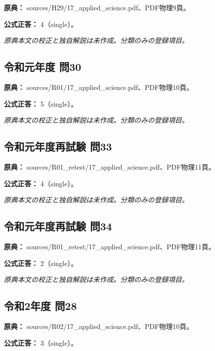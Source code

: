 \noindent\textbf{原典：} sources/H29/17\_applied\_science.pdf、PDF物理9頁。

\textbf{公式正答：} 4（single）。

\par\textit{原典本文の校正と独自解説は未作成。分類のみの登録項目。}

\subsection{令和元年度 問30}
\label{q:r01-reg-applied-30}

\noindent\textbf{原典：} sources/R01/17\_applied\_science.pdf、PDF物理10頁。

\textbf{公式正答：} 5（single）。

\par\textit{原典本文の校正と独自解説は未作成。分類のみの登録項目。}

\subsection{令和元年度再試験 問33}
\label{q:r01-ret-applied-33}

\noindent\textbf{原典：} sources/R01\_retest/17\_applied\_science.pdf、PDF物理11頁。

\textbf{公式正答：} 4（single）。

\par\textit{原典本文の校正と独自解説は未作成。分類のみの登録項目。}

\subsection{令和元年度再試験 問34}
\label{q:r01-ret-applied-34}

\noindent\textbf{原典：} sources/R01\_retest/17\_applied\_science.pdf、PDF物理11頁。

\textbf{公式正答：} 2（single）。

\par\textit{原典本文の校正と独自解説は未作成。分類のみの登録項目。}

\subsection{令和2年度 問28}
\label{q:r02-reg-applied-28}

\noindent\textbf{原典：} sources/R02/17\_applied\_science.pdf、PDF物理10頁。

\textbf{公式正答：} 3（single）。

